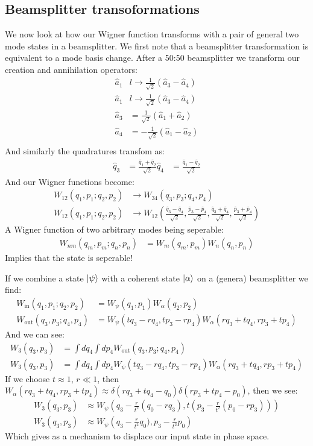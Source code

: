 \subsection{Beamsplitter transoformations}
We now look at how our Wigner function transforms with a pair of general two mode states in a beamsplitter. We first note that a beamsplitter transformation is equivalent to a mode basis change.
After a 50:50 beamsplitter we transform our creation and annihilation operators:
\begin{align*}
	\hat{a}_1 &l\to \frac{1}{\sqrt{2}} (\hat{a}_3 -\hat{a}_4) \\
	\hat{a}_1 &l\to \frac{1}{\sqrt{2}} (\hat{a}_3 -\hat{a}_4) \\
	\hat{a}_3 &= \frac{1}{\sqrt{2}} (\hat{a}_1 +\hat{a}_2) \\
	\hat{a}_4 &= -\frac{1}{\sqrt{2}} (\hat{a}_1 -\hat{a}_2) \\
\end{align*}
And similarly the quadratures transfom as:
\begin{align*}
	\hat{q}_3 &= \frac{\hat{q}_1 + \hat{q}_2}{\sqrt{2}}
	\hat{q}_4 &= \frac{\hat{q}_1 - \hat{q}_2}{\sqrt{2}}
\end{align*}
And our Wigner functions become:
\begin{align*}
	W_{12}(q_1,p_1;q_2,p_2) &\to W_{34}(q_3,p_3;q_4,p_4) \\
	W_{12}(q_1,p_1;q_2,p_2) &\to W_{12}(\frac{\hat{q}_3 - \hat{q}_4}{\sqrt{2}},\frac{\hat{p}_3 - \hat{p}_4}{\sqrt{2}},\frac{\hat{q}_3 + \hat{q}_4}{\sqrt{2}},\frac{\hat{p}_3 + \hat{p}_4}{\sqrt{2}})
\end{align*}
A Wigner function of two arbitrary modes being seperable:
\begin{align*}
	W_{nm}(q_m,p_m;q_n,p_n) &=W_m(q_m,p_m)W_n(q_n,p_n)
\end{align*}
Implies that the state is seperable!

If we combine a state $\ket{\psi}$ with a coherent state $\ket{\alpha}$ on a (genera) beamsplitter we find:
\begin{align*}
	W_\text{in}(q_1,p_1;q_2,p_2) &= W_\psi(q_1,p_1)W_\alpha(q_2,p_2) \\
	W_\text{out}(q_3,p_3;q_4,p_4) &= W_\psi(tq_3 - rq_4,tp_3-rp_4)W_\alpha(rq_3+tq_4,rp_3 +tp_4)
\end{align*}
And we can see:
\begin{align*}
	W_3(q_3,p_3) &= \int dq_4\int dp_4 W_\text{out}(q_3,p_3;q_4,p_4) \\
	W_3(q_3,p_3) &= \int dq_4\int dp_4 W_\psi(tq_3 - rq_4,tp_3-rp_4)W_\alpha(rq_3+tq_4,rp_3 +tp_4)
\end{align*}
If we choose $t\approx 1$, $r\ll 1$, then $W_\alpha(rq_3+tq_4,rp_3 +tp_4) \approx \delta( rq_3 + t q_4 -q_0)\delta(rp_3 + tp_4 - p_0)$, then we see:
\begin{align*}
	W_3(q_3,p_3) &\approx W_\psi\left( q_3 - \frac{r}{t^2} (q_0-rq_3), t\left(p_3 - \frac{r}{t^2} (p_0-rp_3)\right)\right) \\
	W_3(q_3,p_3) &\approx W_\psi\left( q_3 - \frac{r}{t^2} q_0), p_3 - \frac{r}{t^2} p_0\right)
\end{align*}
Which gives as a mechanism to displace our input state in phase space.

